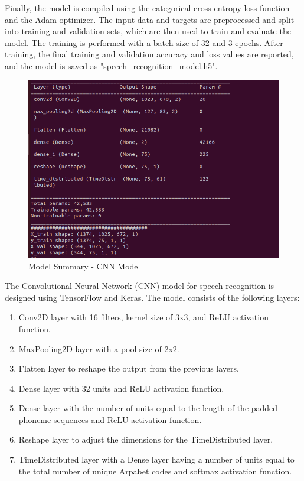\documentclass[12pt]{article}
\begin{document}
Finally, the model is compiled using the categorical cross-entropy loss function and the Adam optimizer. The input data and targets are preprocessed and split into training and validation sets, which are then used to train and evaluate the model. The training is performed with a batch size of 32 and 3 epochs. After training, the final training and validation accuracy and loss values are reported, and the model is saved as "speech\_recognition\_model.h5".


\begin{figure}[ht]
  \centering
  \includegraphics[width=.97\textwidth]{figures/CNNmodel.png}
  \caption{Model Summary - CNN Model}
  \label{fig:overview_architecture}
\end{figure}

The Convolutional Neural Network (CNN) model for speech recognition is designed using TensorFlow and Keras. The model consists of the following layers:

\begin{enumerate}
  \item Conv2D layer with 16 filters, kernel size of 3x3, and ReLU activation function.
  \item MaxPooling2D layer with a pool size of 2x2.
  \item Flatten layer to reshape the output from the previous layers.
  \item Dense layer with 32 units and ReLU activation function.
  \item Dense layer with the number of units equal to the length of the padded phoneme sequences and ReLU activation function.
  \item Reshape layer to adjust the dimensions for the TimeDistributed layer.
  \item TimeDistributed layer with a Dense layer having a number of units equal to the total number of unique Arpabet codes and softmax activation function.
\end{enumerate}
\end{document}

